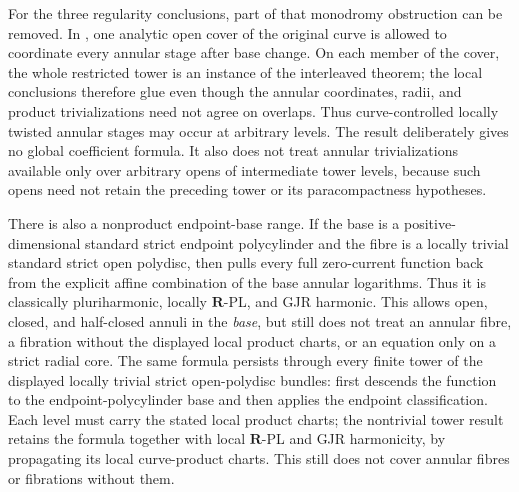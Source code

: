 For the three regularity conclusions, part of that monodromy obstruction can
be removed.  In
, one analytic open
cover of the original curve is allowed to coordinate every annular stage
after base change.  On each member of the cover, the whole restricted tower
is an instance of the interleaved theorem; the local conclusions therefore
glue even though the annular coordinates, radii, and product trivializations
need not agree on overlaps.  Thus curve-controlled locally twisted annular
stages may occur at arbitrary levels.  The result deliberately gives no
global coefficient formula.  It also does not treat annular trivializations
available only over arbitrary opens of intermediate tower levels, because
such opens need not retain the preceding tower or its paracompactness
hypotheses.

There is also a nonproduct endpoint-base range.  If the base is a positive-
dimensional standard strict endpoint polycylinder and the fibre is a locally
trivial standard strict open polydisc, then
 pulls every full
zero-current function back from the explicit affine combination of the base
annular logarithms.  Thus it is classically pluriharmonic, locally
\(\mathbf R\)-PL, and GJR harmonic.  This allows open, closed, and
half-closed annuli in the \emph{base}, but still does not treat an annular
fibre, a fibration without the displayed local product charts, or an equation
only on a strict radial core.
The same formula persists through every finite tower of the displayed locally
trivial strict open-polydisc bundles:
 first descends the
function to the endpoint-polycylinder base and then applies the endpoint
classification.  Each level must carry the stated local product charts; the
nontrivial tower result retains the formula together with local
\(\mathbf R\)-PL and GJR harmonicity, by propagating its local curve-product
charts.  This still does not cover annular fibres or fibrations without
them.

